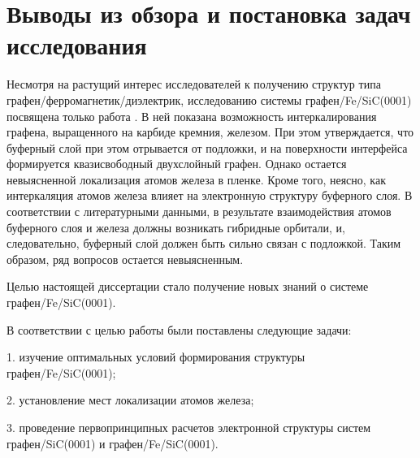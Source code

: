 \section{ Выводы из обзора и постановка задач исследования} \label{chapt3}
Несмотря на растущий интерес исследователей к получению структур типа графен/ферромагнетик/диэлектрик, исследованию системы графен/Fe/SiC(0001) посвящена только работа \cite{C3NR04178F}. В ней показана возможность интеркалирования графена, выращенного на карбиде кремния, железом. При этом утверждается, что буферный слой при этом отрывается от подложки, и на поверхности интерфейса формируется квазисвободный двухслойный графен. Однако остается невыясненной локализация атомов железа в пленке. Кроме того, неясно, как интеркаляция атомов железа влияет на электронную структуру буферного слоя. В соответствии с литературными данными, в результате взаимодействия атомов буферного слоя и железа должны возникать гибридные орбитали, и, следовательно, буферный слой должен быть сильно связан с подложкой. Таким образом, ряд вопросов остается невыясненным. 

Целью настоящей диссертации стало получение новых знаний о системе графен/Fe/SiC(0001).

В соответствии с целью работы были поставлены следующие задачи:

1. изучение оптимальных условий формирования структуры графен/Fe/SiC(0001);

2. установление мест локализации атомов железа;

3. проведение первопринципных расчетов электронной структуры систем графен/SiC(0001) и графен/Fe/SiC(0001).

